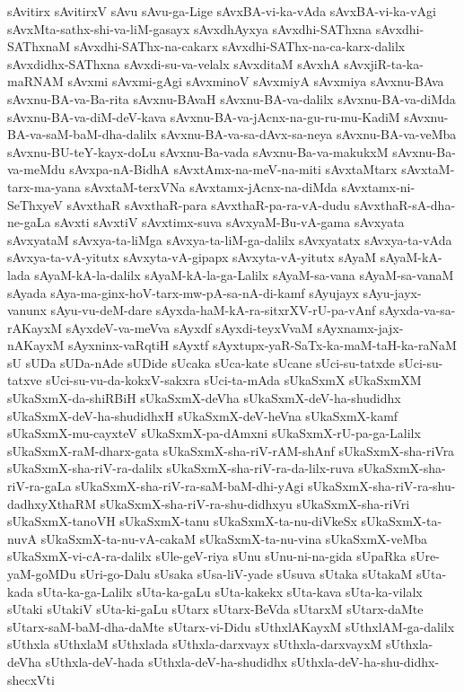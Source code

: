 {sAvitirx
sAvitirxV
sAvu
sAvu-ga-Lige
sAvxBA-vi-ka-vAda
sAvxBA-vi-ka-vAgi
sAvxMta-sathx-shi-va-liM-gasayx
sAvxdhAyxya
sAvxdhi-SAThxna
sAvxdhi-SAThxnaM
sAvxdhi-SAThx-na-cakarx
sAvxdhi-SAThx-na-ca-karx-dalilx
sAvxdidhx-SAThxna
sAvxdi-su-va-velalx
sAvxditaM
sAvxhA
sAvxjiR-ta-ka-maRNAM
sAvxmi
sAvxmi-gAgi
sAvxminoV
sAvxmiyA
sAvxmiya
sAvxnu-BAva
sAvxnu-BA-va-Ba-rita
sAvxnu-BAvaH
sAvxnu-BA-va-dalilx
sAvxnu-BA-va-diMda
sAvxnu-BA-va-diM-deV-kava
sAvxnu-BA-va-jAcnx-na-gu-ru-mu-KadiM
sAvxnu-BA-va-saM-baM-dha-dalilx
sAvxnu-BA-va-sa-dAvx-sa-neya
sAvxnu-BA-va-veMba
sAvxnu-BU-teY-kayx-doLu
sAvxnu-Ba-vada
sAvxnu-Ba-va-makukxM
sAvxnu-Ba-va-meMdu
sAvxpa-nA-BidhA
sAvxtAmx-na-meV-na-miti
sAvxtaMtarx
sAvxtaM-tarx-ma-yana
sAvxtaM-terxVNa
sAvxtamx-jAcnx-na-diMda
sAvxtamx-ni-SeThxyeV
sAvxthaR
sAvxthaR-para
sAvxthaR-pa-ra-vA-dudu
sAvxthaR-sA-dha-ne-gaLa
sAvxti
sAvxtiV
sAvxtimx-suva
sAvxyaM-Bu-vA-gama
sAvxyata
sAvxyataM
sAvxya-ta-liMga
sAvxya-ta-liM-ga-dalilx
sAvxyatatx
sAvxya-ta-vAda
sAvxya-ta-vA-yitutx
sAvxyta-vA-gipapx
sAvxyta-vA-yitutx
sAyaM
sAyaM-kA-lada
sAyaM-kA-la-dalilx
sAyaM-kA-la-ga-Lalilx
sAyaM-sa-vana
sAyaM-sa-vanaM
sAyada
sAya-ma-ginx-hoV-tarx-mw-pA-sa-nA-di-kamf
sAyujayx
sAyu-jayx-vanunx
sAyu-vu-deM-dare
sAyxda-haM-kA-ra-sitxrXV-rU-pa-vAnf
sAyxda-va-sa-rAKayxM
sAyxdeV-va-meVva
sAyxdf
sAyxdi-teyxVvaM
sAyxnamx-jajx-nAKayxM
sAyxninx-vaRqtiH
sAyxtf
sAyxtupx-yaR-SaTx-ka-maM-taH-ka-raNaM
sU
sUDa
sUDa-nAde
sUDide
sUcaka
sUca-kate
sUcane
sUci-su-tatxde
sUci-su-tatxve
sUci-su-vu-da-kokxV-sakxra
sUci-ta-mAda
sUkaSxmX
sUkaSxmXM
sUkaSxmX-da-shiRBiH
sUkaSxmX-deVha
sUkaSxmX-deV-ha-shudidhx
sUkaSxmX-deV-ha-shudidhxH
sUkaSxmX-deV-heVna
sUkaSxmX-kamf
sUkaSxmX-mu-cayxteV
sUkaSxmX-pa-dAmxni
sUkaSxmX-rU-pa-ga-Lalilx
sUkaSxmX-raM-dharx-gata
sUkaSxmX-sha-riV-rAM-shAnf
sUkaSxmX-sha-riVra
sUkaSxmX-sha-riV-ra-dalilx
sUkaSxmX-sha-riV-ra-da-lilx-ruva
sUkaSxmX-sha-riV-ra-gaLa
sUkaSxmX-sha-riV-ra-saM-baM-dhi-yAgi
sUkaSxmX-sha-riV-ra-shu-dadhxyXthaRM
sUkaSxmX-sha-riV-ra-shu-didhxyu
sUkaSxmX-sha-riVri
sUkaSxmX-tanoVH
sUkaSxmX-tanu
sUkaSxmX-ta-nu-diVkeSx
sUkaSxmX-ta-nuvA
sUkaSxmX-ta-nu-vA-cakaM
sUkaSxmX-ta-nu-vina
sUkaSxmX-veMba
sUkaSxmX-vi-cA-ra-dalilx
sUle-geV-riya
sUnu
sUnu-ni-na-gida
sUpaRka
sUre-yaM-goMDu
sUri-go-Dalu
sUsaka
sUsa-liV-yade
sUsuva
sUtaka
sUtakaM
sUta-kada
sUta-ka-ga-Lalilx
sUta-ka-gaLu
sUta-kakekx
sUta-kava
sUta-ka-vilalx
sUtaki
sUtakiV
sUta-ki-gaLu
sUtarx
sUtarx-BeVda
sUtarxM
sUtarx-daMte
sUtarx-saM-baM-dha-daMte
sUtarx-vi-Didu
sUthxlAKayxM
sUthxlAM-ga-dalilx
sUthxla
sUthxlaM
sUthxlada
sUthxla-darxvayx
sUthxla-darxvayxM
sUthxla-deVha
sUthxla-deV-hada
sUthxla-deV-ha-shudidhx
sUthxla-deV-ha-shu-didhx-shecxVti
}
